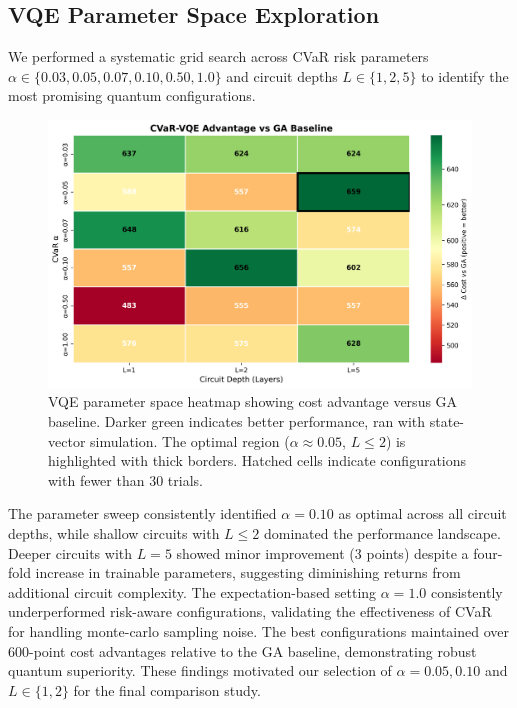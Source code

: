\subsection{VQE Parameter Space Exploration}
\label{sec:appendix_vqe_grid}

We performed a systematic grid search across CVaR risk parameters $\alpha \in \{0.03, 0.05, 0.07, 0.10, 0.50, 1.0\}$ and circuit depths $L \in \{1, 2, 5\}$ to identify the most promising quantum configurations.

\begin{figure}[h]
  \centering
  \includegraphics[width=0.9\linewidth]{figures/vqe_alpha_layer_heatmap.png}
  \caption{VQE parameter space heatmap showing cost advantage versus GA baseline. Darker green indicates better performance, ran with state-vector simulation. The optimal region ($\alpha \approx 0.05$, $L \leq 2$) is highlighted with thick borders. Hatched cells indicate configurations with fewer than 30 trials.}
  \label{fig:vqe_parameter_grid}
\end{figure}

The parameter sweep consistently identified $\alpha = 0.10$ as optimal across all circuit depths, while shallow circuits with $L \leq 2$ dominated the performance landscape. Deeper circuits with $L = 5$ showed minor improvement (3 points) despite a four-fold increase in trainable parameters, suggesting diminishing returns from additional circuit complexity. The expectation-based setting $\alpha = 1.0$ consistently underperformed risk-aware configurations, validating the effectiveness of CVaR for handling monte-carlo sampling noise. The best configurations maintained over 600-point cost advantages relative to the GA baseline, demonstrating robust quantum superiority. These findings motivated our selection of $\alpha = 0.05, 0.10$ and $L \in \{1, 2\}$ for the final comparison study.

